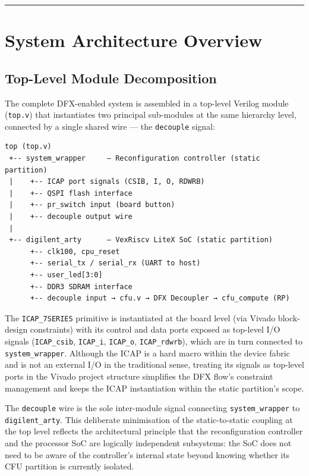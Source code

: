 \vspace{0.4em}\hrule\vspace{0.4em}

\section{System Architecture Overview}

\subsection{Top-Level Module Decomposition}

The complete DFX-enabled system is assembled in a top-level Verilog module (\texttt{top.v}) that instantiates two principal sub-modules at the same hierarchy level, connected by a single shared wire — the \texttt{decouple} signal:

\begin{lstlisting}[style=mystyle]
top (top.v)
 +-- system_wrapper     — Reconfiguration controller (static partition)
 |    +-- ICAP port signals (CSIB, I, O, RDWRB)
 |    +-- QSPI flash interface
 |    +-- pr_switch input (board button)
 |    +-- decouple output wire
 |
 +-- digilent_arty      — VexRiscv LiteX SoC (static partition)
      +-- clk100, cpu_reset
      +-- serial_tx / serial_rx (UART to host)
      +-- user_led[3:0]
      +-- DDR3 SDRAM interface
      +-- decouple input → cfu.v → DFX Decoupler → cfu_compute (RP)
\end{lstlisting}

The \texttt{ICAP\_7SERIES} primitive is instantiated at the board level (via Vivado block-design constraints) with its control and data ports exposed as top-level I/O signals (\texttt{ICAP\_csib}, \texttt{ICAP\_i}, \texttt{ICAP\_o}, \texttt{ICAP\_rdwrb}), which are in turn connected to \texttt{system\_wrapper}. Although the ICAP is a hard macro within the device fabric and is not an external I/O in the traditional sense, treating its signals as top-level ports in the Vivado project structure simplifies the DFX flow's constraint management and keeps the ICAP instantiation within the static partition's scope.

The \texttt{decouple} wire is the sole inter-module signal connecting \texttt{system\_wrapper} to \texttt{digilent\_arty}. This deliberate minimisation of the static-to-static coupling at the top level reflects the architectural principle that the reconfiguration controller and the processor SoC are logically independent subsystems: the SoC does not need to be aware of the controller's internal state beyond knowing whether its CFU partition is currently isolated.

